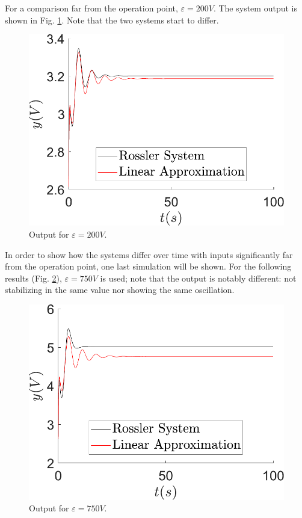 For a comparison far from the operation point, $\varepsilon=200V$. The system output is shown in Fig. \ref{fig:comparDelta200}. Note that the two systems start to differ.
\begin{figure}[ht]
    \centering
    \includegraphics[scale=0.5]{figs/comparLinearVSNonlinear/yvsT_InputDelta200.pdf}
    \caption{Output for $\varepsilon=200V$.}
    \label{fig:comparDelta200}
\end{figure}

In order to show how the systems differ over time with inputs significantly far from the operation point, one last simulation will be shown. For the following results (Fig. \ref{fig:comparDelta750}), $\varepsilon=750V$ is used; note that the output is notably different: not stabilizing in the same value nor showing the same oscillation.
\begin{figure}[H]
    \centering
    \includegraphics[scale=0.5]{figs/comparLinearVSNonlinear/yvsT_InputDelta750.pdf}
    \caption{Output for $\varepsilon=750V$.}
    \label{fig:comparDelta750}
\end{figure}

